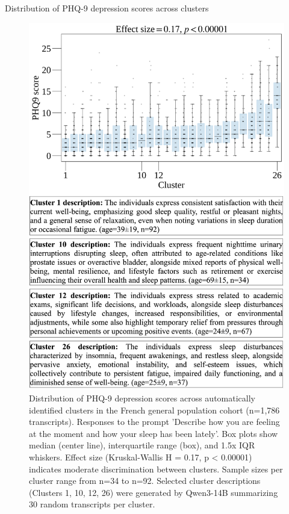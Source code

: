 \documentclass[handout,10pt]{beamer}
\begin{document}
\begin{frame}{Distribution of PHQ-9 depression scores across clusters}
  \begin{figure}
    \centering
    \includegraphics[scale=0.2]{img/topic_modeling/boxplot_description/popgen_description_larger.png}
    \caption{Distribution of PHQ-9 depression scores across automatically identified clusters in the French general population cohort (n=1,786 transcripts). Responses to the prompt 'Describe how you are feeling at the moment and how your sleep has been lately'. Box plots show median (center line), interquartile range (box), and 1.5x IQR whiskers. Effect size (Kruskal-Wallis H = 0.17, p < 0.00001) indicates moderate discrimination between clusters. Sample sizes per cluster range from n=34 to n=92. Selected cluster descriptions (Clusters 1, 10, 12, 26) were generated by Qwen3-14B summarizing 30 random transcripts per cluster.}
    \label{fig:popgen_description}
\end{figure}
\end{frame}
\end{document}
